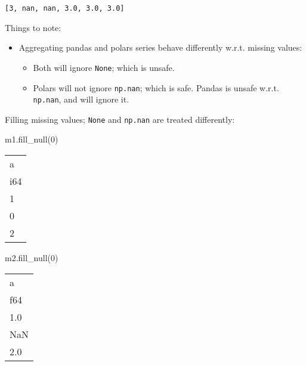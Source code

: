 \documentclass[
  letterpaper,
  DIV=11,
  numbers=noendperiod]{scrartcl}
\newenvironment{Shaded}{\begin{snugshade}}{\end{snugshade}}
\newcommand{\DecValTok}[1]{\textcolor[rgb]{0.68,0.00,0.00}{#1}}
\newcommand{\NormalTok}[1]{\textcolor[rgb]{0.00,0.23,0.31}{#1}}
\providecommand{\tightlist}{%
  \setlength{\itemsep}{0pt}\setlength{\parskip}{0pt}}\usepackage{longtable,booktabs,array}
\begin{document}
\begin{verbatim}
[3, nan, nan, 3.0, 3.0, 3.0]
\end{verbatim}

Things to note:

\begin{itemize}
\tightlist
\item
  Aggregating pandas and polars series behave differently w.r.t. missing
  values:

  \begin{itemize}
  \tightlist
  \item
    Both will ignore \texttt{None}; which is unsafe.
  \item
    Polars will not ignore \texttt{np.nan}; which is safe. Pandas is
    unsafe w.r.t. \texttt{np.nan}, and will ignore it.
  \end{itemize}
\end{itemize}

Filling missing values; \texttt{None} and \texttt{np.nan} are treated
differently:

\begin{Shaded}
\begin{Highlighting}[]
\NormalTok{m1.fill\_null(}\DecValTok{0}\NormalTok{)}
\end{Highlighting}
\end{Shaded}

\begin{longtable}[]{@{}l@{}}
\toprule()
a \\
i64 \\
\midrule()
\endhead
1 \\
0 \\
2 \\
\bottomrule()
\end{longtable}

\begin{Shaded}
\begin{Highlighting}[]
\NormalTok{m2.fill\_null(}\DecValTok{0}\NormalTok{)}
\end{Highlighting}
\end{Shaded}

\begin{longtable}[]{@{}l@{}}
\toprule()
a \\
f64 \\
\midrule()
\endhead
1.0 \\
NaN \\
2.0 \\
\bottomrule()
\end{longtable}
\end{document}
